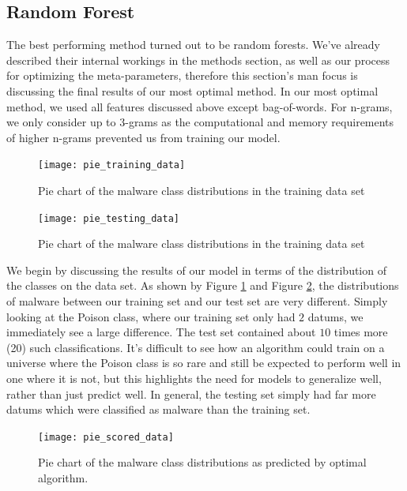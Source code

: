 \documentclass[letterpaper]{article}
\begin{document}
\subsection{Random Forest}
\noindent The best performing method turned out to be random forests. We've already described their internal workings in the methods section, as well as our process for optimizing the meta-parameters, therefore this section's man focus is discussing the final results of our most optimal method. In our most optimal method, we used all features discussed above except bag-of-words. For n-grams, we only consider up to 3-grams as the computational and memory requirements of higher n-grams prevented us from training our model.

\begin{figure}[h!]
	\centering
    \texttt{[image: pie\_training\_data]}
    \caption{Pie chart of the malware class distributions in the training data set}
    \label{fig:pie_chart_train}
\end{figure}

\begin{figure}[h!]
	\centering
    \texttt{[image: pie\_testing\_data]}
    \caption{Pie chart of the malware class distributions in the training data set}
    \label{fig:pie_chart_test}
\end{figure}

\noindent We begin by discussing the results of our model in terms of the distribution of the classes on the data set. As shown by Figure \ref{fig:pie_chart_train} and Figure \ref{fig:pie_chart_test}, the distributions of malware between our training set and our test set are very different. Simply looking at the Poison class, where our training set only had $2$ datums, we immediately see a large difference. The test set contained about $10$ times more (20) such classifications. It's difficult to see how an algorithm could train on a universe where the Poison class is so rare and still be expected to perform well in one where it is not, but this highlights the need for models to generalize well, rather than just predict well. In general, the testing set simply had far more datums which were classified as malware than the training set. 

\begin{figure}[h!]
	\centering
    \texttt{[image: pie\_scored\_data]}
    \caption{Pie chart of the malware class distributions as predicted by optimal algorithm.}
    \label{fig:pie_chart_scored}
\end{figure}
\end{document}
